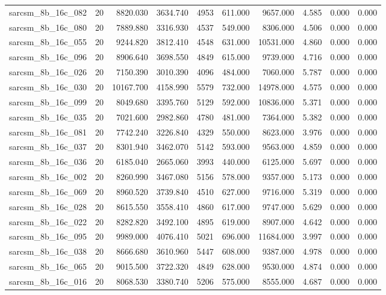 \begin{tabular}{lrrrrrrrrr}
sarcsm\_8b\_16c\_082 & 20 & 8820.030 & 3634.740 & 4953 & 611.000 & 9657.000 & 4.585 & 0.000 & 0.000 \\
sarcsm\_8b\_16c\_080 & 20 & 7889.880 & 3316.930 & 4537 & 549.000 & 8306.000 & 4.506 & 0.000 & 0.000 \\
sarcsm\_8b\_16c\_055 & 20 & 9244.820 & 3812.410 & 4548 & 631.000 & 10531.000 & 4.860 & 0.000 & 0.000 \\
sarcsm\_8b\_16c\_096 & 20 & 8906.640 & 3698.550 & 4849 & 615.000 & 9739.000 & 4.716 & 0.000 & 0.000 \\
sarcsm\_8b\_16c\_026 & 20 & 7150.390 & 3010.390 & 4096 & 484.000 & 7060.000 & 5.787 & 0.000 & 0.000 \\
sarcsm\_8b\_16c\_030 & 20 & 10167.700 & 4158.990 & 5579 & 732.000 & 14978.000 & 4.575 & 0.000 & 0.000 \\
sarcsm\_8b\_16c\_099 & 20 & 8049.680 & 3395.760 & 5129 & 592.000 & 10836.000 & 5.371 & 0.000 & 0.000 \\
sarcsm\_8b\_16c\_035 & 20 & 7021.600 & 2982.860 & 4780 & 481.000 & 7364.000 & 5.382 & 0.000 & 0.000 \\
sarcsm\_8b\_16c\_081 & 20 & 7742.240 & 3226.840 & 4329 & 550.000 & 8623.000 & 3.976 & 0.000 & 0.000 \\
sarcsm\_8b\_16c\_037 & 20 & 8301.940 & 3462.070 & 5142 & 593.000 & 9563.000 & 4.859 & 0.000 & 0.000 \\
sarcsm\_8b\_16c\_036 & 20 & 6185.040 & 2665.060 & 3993 & 440.000 & 6125.000 & 5.697 & 0.000 & 0.000 \\
sarcsm\_8b\_16c\_002 & 20 & 8260.990 & 3467.080 & 5156 & 578.000 & 9357.000 & 5.173 & 0.000 & 0.000 \\
sarcsm\_8b\_16c\_069 & 20 & 8960.520 & 3739.840 & 4510 & 627.000 & 9716.000 & 5.319 & 0.000 & 0.000 \\
sarcsm\_8b\_16c\_028 & 20 & 8615.550 & 3558.410 & 4860 & 617.000 & 9747.000 & 5.629 & 0.000 & 0.000 \\
sarcsm\_8b\_16c\_022 & 20 & 8282.820 & 3492.100 & 4895 & 619.000 & 8907.000 & 4.642 & 0.000 & 0.000 \\
sarcsm\_8b\_16c\_095 & 20 & 9989.000 & 4076.410 & 5021 & 696.000 & 11684.000 & 3.997 & 0.000 & 0.000 \\
sarcsm\_8b\_16c\_038 & 20 & 8666.680 & 3610.960 & 5447 & 608.000 & 9387.000 & 4.978 & 0.000 & 0.000 \\
sarcsm\_8b\_16c\_065 & 20 & 9015.500 & 3722.320 & 4849 & 628.000 & 9530.000 & 4.874 & 0.000 & 0.000 \\
sarcsm\_8b\_16c\_016 & 20 & 8068.530 & 3380.740 & 5206 & 575.000 & 8555.000 & 4.687 & 0.000 & 0.000 \\

\end{tabular}
